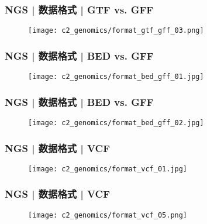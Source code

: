 \begin{frame}
  \frametitle{NGS | 数据格式 | GTF vs. GFF}
  \begin{figure}
    \centering
    \texttt{[image: c2\_genomics/format\_gtf\_gff\_03.png]}
  \end{figure}
\end{frame}

\begin{frame}
  \frametitle{NGS | 数据格式 | \alert{BED vs. GFF}}
  \begin{figure}
    \centering
    \texttt{[image: c2\_genomics/format\_bed\_gff\_01.jpg]}
  \end{figure}
\end{frame}

\begin{frame}
  \frametitle{NGS | 数据格式 | BED vs. GFF}
  \begin{figure}
    \centering
    \texttt{[image: c2\_genomics/format\_bed\_gff\_02.jpg]}
  \end{figure}
\end{frame}

\begin{frame}
  \frametitle{NGS | 数据格式 | VCF}
  \begin{figure}
    \centering
    \texttt{[image: c2\_genomics/format\_vcf\_01.jpg]}
  \end{figure}
\end{frame}

\begin{frame}
  \frametitle{NGS | 数据格式 | \alert{VCF}}
  \begin{figure}
    \centering
    \texttt{[image: c2\_genomics/format\_vcf\_05.png]}
  \end{figure}
\end{frame}

